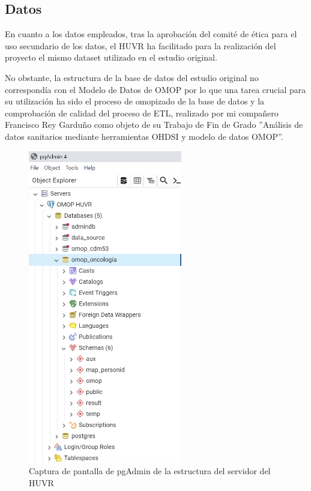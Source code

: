 \subsection{Datos}


En cuanto a los datos empleados, tras la aprobación del comité de ética para el uso secundario de los datos, el HUVR ha facilitado  para la realización del proyecto el mismo dataset utilizado en el estudio original.

No obstante, la estructura de la base de datos del estudio original no correspondía con el Modelo de Datos de OMOP por lo que una tarea crucial para su utilización ha sido el proceso de omopizado de la base de datos y la comprobación de calidad del proceso de ETL, realizado por mi compañero Francisco Rey Garduño como objeto de su Trabajo de Fin de Grado ''Análisis de datos sanitarios mediante herramientas OHDSI y 
modelo de datos OMOP''.


\begin{figure}[H]
    \centering
    \includegraphics[width=0.60\textwidth]{figures/servidorHUVR.png}
    \caption{Captura de pantalla de pgAdmin de la estructura del servidor del HUVR}
    \label{figure:servidorHUVR}
\end{figure}

